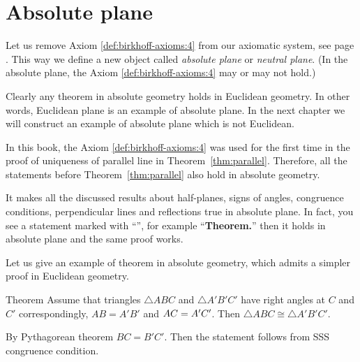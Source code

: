 \chapter{Absolute plane}\label{chap:non-euclid}

Let us remove Axiom \ref{def:birkhoff-axioms:4} from our axiomatic system, see page \pageref{def:birkhoff-axioms:0}.
This way we define a new object called 
\emph{absolute plane} or \emph{neutral plane}.
(In the absolute plane, 
the Axiom \ref{def:birkhoff-axioms:4} may or may not hold.)

Clearly any theorem in absolute geometry holds in Euclidean geometry.
In other words, Euclidean plane is an example of absolute plane. 
In the next chapter we will construct an example of absolute plane which is not Euclidean.

In this book, 
the Axiom \ref{def:birkhoff-axioms:4} was used
for the first time in the proof of uniqueness of parallel line in Theorem~\ref{thm:parallel}.
Therefore, all the statements before Theorem~\ref{thm:parallel} also hold in absolute geometry.

It makes all the discussed results
about
half-planes,
signs of angles,
congruence conditions,
perpendicular lines and reflections 
true in absolute plane.
In fact, you see a statement marked with ``\a'',\label{a-mark} for example ``\textbf{Theorem.\abs}''
then it holds in absolute plane and the same proof works.


Let us give an example of theorem in absolute geometry,
which admits a simpler proof in Euclidean geometry. 

\begin{thm}{Theorem}
Assume that triangles $\triangle ABC$ and $\triangle A'B'C'$
have right angles at $C$ and $C'$ correspondingly, 
$AB=A'B'$ and $AC\z=A'C'$.
Then $\triangle ABC\cong\triangle A'B'C'$.
\end{thm}


By Pythagorean theorem $BC=B'C'$.
Then the statement follows from SSS congruence condition.
\qeds

